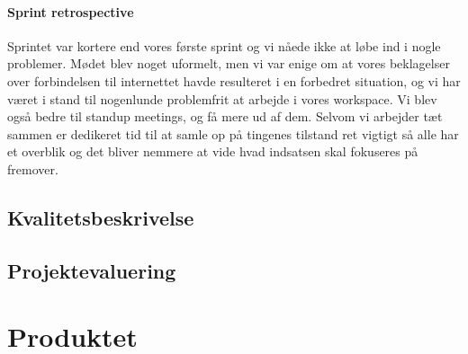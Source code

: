 \documentclass[12pt, a4paper]{report}
\begin{document}
\subsubsection{Sprint retrospective}

Sprintet var kortere end vores første sprint og vi nåede ikke at løbe ind i nogle problemer. Mødet blev noget uformelt, men vi var enige om at vores beklagelser over forbindelsen til internettet havde resulteret i en forbedret situation, og vi har været i stand til nogenlunde problemfrit at arbejde i vores workspace. Vi blev også bedre til standup meetings, og få mere ud af dem. Selvom vi arbejder tæt sammen er dedikeret tid til at samle op på tingenes tilstand ret vigtigt så alle har et overblik og det bliver nemmere at vide hvad indsatsen skal fokuseres på fremover.

\section{Kvalitetsbeskrivelse}

\section{Projektevaluering}

\chapter{Produktet}
\end{document}
